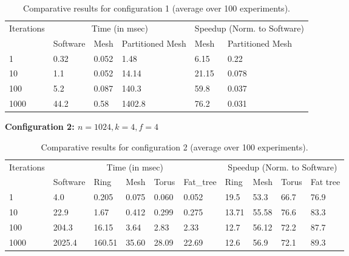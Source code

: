 \documentclass[conference, 9pt]{IEEEtran}
\begin{document}
\begin{table}[!htpb]
  \centering
	\begin{tabular}{| l | l | l | l | l | l |}
	\hline
	Iterations & \multicolumn{3}{c}{Time (in msec)} \vline & \multicolumn{2}{c}{Speedup (Norm. to Software)} \vline \\
	 \cline{2-6}
 	& Software & Mesh & Partitioned Mesh & Mesh & Partitioned Mesh \\
 \hline
 
	 1 & 0.32 & 0.052 & 1.48 & 6.15 & 0.22  \\
	 10 & 1.1 & 0.052 & 14.14 & 21.15 & 0.078 \\
	 100 & 5.2 & 0.087 & 140.3 & 59.8 & 0.037 \\
	 1000 & 44.2 & 0.58 & 1402.8 & 76.2 & 0.031 \\
\hline

\end{tabular}
\caption{Comparative results for configuration 1 (average over 100 experiments).}
\label{table_c1}
\end{table}

\noindent \textbf{Configuration 2: $n = 1024, k = 4, f = 4$}\\

\begin{table}[!htpb]
  \centering
	\begin{tabular}{| l | l | l | l | l | l | l | l | l | l |}
	\hline
	Iterations & \multicolumn{5}{c}{Time (in msec)} \vline & \multicolumn{4}{c}{Speedup (Norm. to Software)} \vline \\
	 \cline{2-10}
 	& Software & Ring & Mesh & Torus & Fat\_tree & Ring & Mesh & Torus & 	Fat tree\\
 \hline
 
	 1 & 4.0 & 0.205 & 0.075 & 0.060 & 0.052 & 19.5 & 53.3 & 66.7 &  76.9 \\
	 10 & 22.9 & 1.67 & 0.412 & 0.299 & 0.275 & 13.71 & 55.58 & 76.6 & 83.3 \\
	 100 & 204.3& 16.15 & 3.64 & 2.83 & 2.33 & 12.7 & 56.12 & 72.2 & 87.7 \\
	 1000 & 2025.4 & 160.51 & 35.60 & 28.09 & 22.69 & 12.6 & 56.9 & 72.1 & 89.3 \\
\hline

\end{tabular}
\caption{Comparative results for configuration 2 (average over 100 experiments).}
\label{table_c2}
\end{table}
\end{document}
